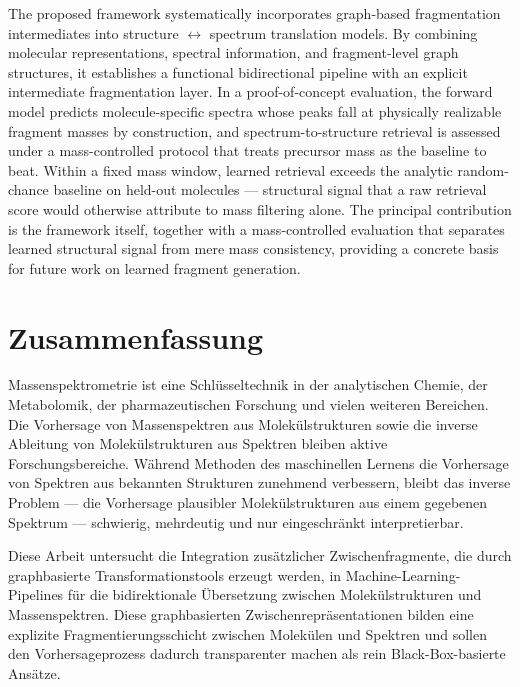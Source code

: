 The proposed framework systematically incorporates graph-based fragmentation intermediates into structure $\leftrightarrow$ spectrum translation models.
By combining molecular representations, spectral information, and fragment-level graph structures, it establishes a functional bidirectional pipeline with an explicit intermediate fragmentation layer.
In a proof-of-concept evaluation, the forward model predicts molecule-specific spectra whose peaks fall at physically realizable fragment masses by construction, and spectrum-to-structure retrieval is assessed under a mass-controlled protocol that treats precursor mass as the baseline to beat. Within a fixed mass window, learned retrieval exceeds the analytic random-chance baseline on held-out molecules --- structural signal that a raw retrieval score would otherwise attribute to mass filtering alone.
The principal contribution is the framework itself, together with a mass-controlled evaluation that separates learned structural signal from mere mass consistency, providing a concrete basis for future work on learned fragment generation.

{}
\clearpage
\chapter*{Zusammenfassung}
Massenspektrometrie ist eine Schlüsseltechnik in der analytischen Chemie, der Metabolomik, der pharmazeutischen Forschung und vielen weiteren Bereichen.
Die Vorhersage von Massenspektren aus Molekülstrukturen sowie die inverse Ableitung von Molekülstrukturen aus Spektren bleiben aktive Forschungsbereiche.
Während Methoden des maschinellen Lernens die Vorhersage von Spektren aus bekannten Strukturen zunehmend verbessern, bleibt das inverse Problem --- die Vorhersage plausibler Molekülstrukturen aus einem gegebenen Spektrum --- schwierig, mehrdeutig und nur eingeschränkt interpretierbar.

Diese Arbeit untersucht die Integration zusätzlicher Zwischenfragmente, die durch graphbasierte Transformationstools erzeugt werden, in Machine-Learning-Pipelines für die bidirektionale Übersetzung zwischen Molekülstrukturen und Massenspektren.
Diese graphbasierten Zwischenrepräsentationen bilden eine explizite Fragmentierungsschicht zwischen Molekülen und Spektren und sollen den Vorhersageprozess dadurch transparenter machen als rein Black-Box-basierte Ansätze.

